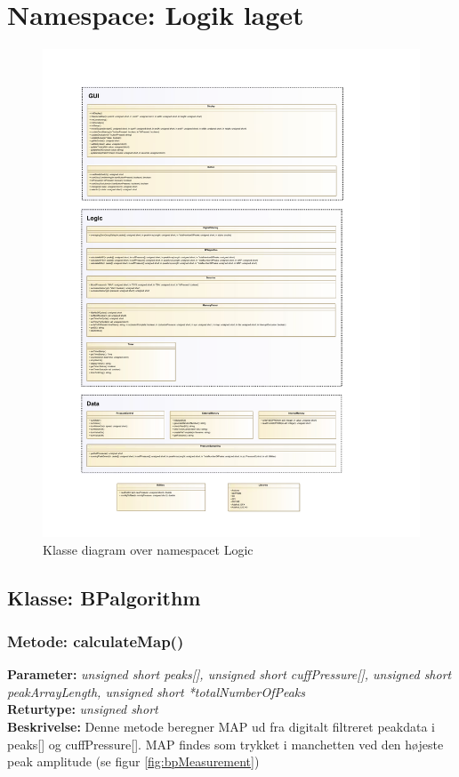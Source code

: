 \section{Namespace: Logik laget}

\begin{figure}[H]
\includegraphics[width=\textwidth]{Implementeringsdokument/klassediagram_Logic-crop.pdf}
\caption{Klasse diagram over namespacet Logic}\label{fig:classDiagramLogic}
\end{figure}

\subsection{Klasse: BPalgorithm}

\subsubsection{Metode: calculateMap()}
\textbf{Parameter: } \textit{unsigned short peaks[], unsigned short cuffPressure[], unsigned short peakArrayLength, unsigned short *totalNumberOfPeaks}
\\ \textbf{Returtype: } \textit{unsigned short}
\\ \textbf{Beskrivelse: } Denne metode beregner MAP ud fra digitalt filtreret peakdata i peaks[] og cuffPressure[]. MAP findes som trykket i manchetten ved den højeste peak amplitude (se figur \ref{fig:bpMeasurement})

